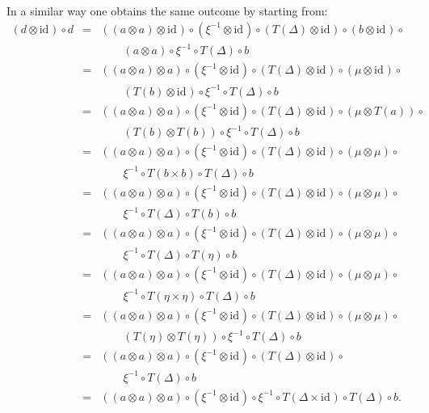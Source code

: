 \documentclass{LMCS}
\newcommand{\after}{\mathrel{\circ}}
\newcommand{\idmap}[1][]{\ensuremath{\mathrm{id}_{#1}}}
\begin{document}
{\noindent In a similar way one obtains the same outcome by starting from:
$$\begin{array}{rcl}
(d\otimes\idmap) \after d
& = &
((a \otimes a) \otimes\idmap) \after (\xi^{-1}\otimes\idmap) 
   \after (T(\Delta)\otimes\idmap) \after (b\otimes\idmap) \after \\
& & \qquad
   (a \otimes a) \after \xi^{-1} \after T(\Delta) \after b \\
& = &
((a \otimes a) \otimes a) \after (\xi^{-1}\otimes\idmap) 
   \after (T(\Delta)\otimes\idmap) \after (\mu\otimes\idmap) \after \\
& & \qquad
   (T(b)\otimes\idmap) \after \xi^{-1} \after T(\Delta) \after b \\
& = &
((a \otimes a) \otimes a) \after (\xi^{-1}\otimes\idmap) 
   \after (T(\Delta)\otimes\idmap) \after (\mu\otimes T(a )) \after \\
& & \qquad
   (T(b)\otimes T(b)) \after \xi^{-1} \after T(\Delta) \after b \\
& = &
((a \otimes a) \otimes a) \after (\xi^{-1}\otimes\idmap) 
   \after (T(\Delta)\otimes\idmap) \after (\mu\otimes\mu) \after \\
& & \qquad
   \xi^{-1} \after T(b\times b) \after T(\Delta) \after b \\
& = &
((a \otimes a) \otimes a) \after (\xi^{-1}\otimes\idmap) 
   \after (T(\Delta)\otimes\idmap) \after (\mu\otimes\mu) \after \\
& & \qquad
   \xi^{-1} \after T(\Delta) \after T(b) \after b \\
& = &
((a \otimes a) \otimes a) \after (\xi^{-1}\otimes\idmap) 
   \after (T(\Delta)\otimes\idmap) \after (\mu\otimes\mu) \after \\
& & \qquad
   \xi^{-1} \after T(\Delta) \after T(\eta) \after b \\
& = &
((a \otimes a) \otimes a) \after (\xi^{-1}\otimes\idmap) 
   \after (T(\Delta)\otimes\idmap) \after (\mu\otimes\mu) \after \\
& & \qquad
   \xi^{-1} \after T(\eta\times \eta) \after T(\Delta) \after b \\
& = &
((a \otimes a) \otimes a) \after (\xi^{-1}\otimes\idmap) 
   \after (T(\Delta)\otimes\idmap) \after (\mu\otimes\mu) \after \\
& & \qquad
   (T(\eta)\otimes T(\eta)) \after \xi^{-1} \after T(\Delta) \after b \\
& = &
((a \otimes a) \otimes a) \after (\xi^{-1}\otimes\idmap) 
   \after (T(\Delta)\otimes\idmap) \after \\
& & \qquad
   \xi^{-1} \after T(\Delta) \after b \\
& = &
((a \otimes a) \otimes a) \after (\xi^{-1} \otimes \idmap) \after \xi^{-1} 
   \after T(\Delta \times \idmap) \after T(\Delta) \after b.
\end{array}$$

}
\end{document}
